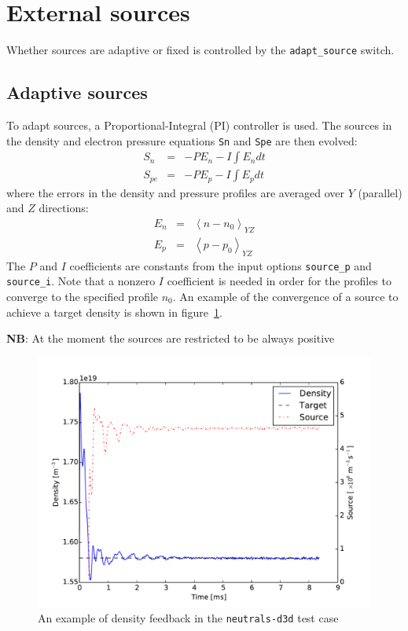\documentclass[12pt,a4paper]{article}
\begin{document}
\section{External sources}

Whether sources are adaptive or fixed is controlled by the
\texttt{adapt\_source} switch.

\subsection{Adaptive sources}

To adapt sources, a Proportional-Integral (PI) controller
is used. The sources in the density and electron pressure equations \texttt{Sn} and \texttt{Spe} are then evolved:
\begin{eqnarray}
  S_n &=& -P E_n - I \int E_n dt \\
  S_{pe} &=& -P E_p - I \int E_p dt
\end{eqnarray}
where the errors in the density and pressure profiles are
averaged over $Y$ (parallel) and $Z$ directions:
\begin{eqnarray}
  E_n &=& \left< n - n_0\right>_{YZ} \\
  E_p &=& \left< p - p_0\right>_{YZ}
\end{eqnarray}
The $P$ and $I$ coefficients are constants from the input options
\texttt{source\_p} and \texttt{source\_i}. Note that a nonzero $I$ coefficient is needed in order for the profiles to converge to the specified profile $n_0$. An example of the convergence of a source to achieve a target density is shown in figure~\ref{fig:density_feedback}.

{\bf NB}: At the moment the sources are restricted to be always positive

\begin{figure}[h]
\centering
\includegraphics[width=0.7\columnwidth]{figs/DIII-D/density_feedback.pdf}
\caption{An example of density feedback in the \texttt{neutrals-d3d} test case}
\label{fig:density_feedback}
\end{figure}
\end{document}
